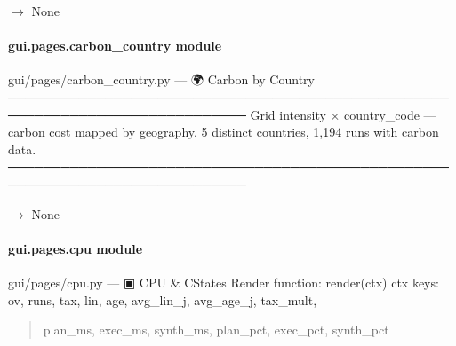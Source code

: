 \documentclass[letterpaper,10pt,english]{sphinxmanual}
\begin{document}
\begin{fulllineitems}
\label{\detokenize{gui.pages.baseline:gui.pages.baseline.render}}
\pysigstartsignatures
\pysiglinewithargsret
{}
{}
{{ $\rightarrow$ None}}
\pysigstopsignatures
\end{fulllineitems}


\sphinxstepscope


\paragraph{gui.pages.carbon\_country module}
\label{\detokenize{gui.pages.carbon_country:module-gui.pages.carbon_country}}\label{\detokenize{gui.pages.carbon_country:gui-pages-carbon-country-module}}\label{\detokenize{gui.pages.carbon_country::doc}}
\sphinxAtStartPar
gui/pages/carbon\_country.py  —  🌍  Carbon by Country
─────────────────────────────────────────────────────────────────────────────
Grid intensity × country\_code — carbon cost mapped by geography.
5 distinct countries, 1,194 runs with carbon data.
─────────────────────────────────────────────────────────────────────────────

\begin{fulllineitems}
\label{\detokenize{gui.pages.carbon_country:gui.pages.carbon_country.render}}
\pysigstartsignatures
\pysiglinewithargsret
{}
{}
{{ $\rightarrow$ None}}
\pysigstopsignatures
\end{fulllineitems}


\sphinxstepscope


\paragraph{gui.pages.cpu module}
\label{\detokenize{gui.pages.cpu:module-gui.pages.cpu}}\label{\detokenize{gui.pages.cpu:gui-pages-cpu-module}}\label{\detokenize{gui.pages.cpu::doc}}
\sphinxAtStartPar
gui/pages/cpu.py  —  ▣  CPU \& C\sphinxhyphen{}States
Render function: render(ctx)
ctx keys: ov, runs, tax, lin, age, avg\_lin\_j, avg\_age\_j, tax\_mult,
\begin{quote}

\sphinxAtStartPar
plan\_ms, exec\_ms, synth\_ms, plan\_pct, exec\_pct, synth\_pct
\end{quote}
\end{document}
